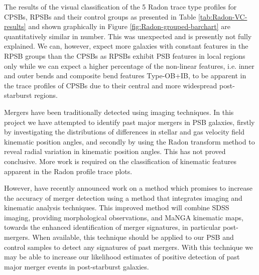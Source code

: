 The results of the visual classification of the 5 Radon trace type profiles for CPSBs, RPSBs and their control groups as presented in Table \ref{tab:Radon-VC-results} and shown graphically in Figure \ref{fig:Radon-grouped-barchart} are quantitatively similar in number. This was unexpected and is presently not fully explained. We can, however, expect more galaxies with constant features in the RPSB groups than the CPSBs as RPSBs exhibit PSB features in local regions only while we can expect a higher percentage of the non-linear features, i.e. inner and outer bends and composite bend features Type-OB+IB, to be apparent in the trace profiles of CPSBs due to their central and more widespread post-starburst regions. 

Mergers have been traditionally detected using imaging techniques. In this project we have attempted to identify past major mergers in PSB galaxies, firstly by investigating the distributions of differences in stellar and gas velocity field kinematic position angles, and secondly by using the Radon transform method to reveal radial variation in kinematic position angles. This has not proved conclusive. More work is required on the classification of kinematic features apparent in the Radon profile trace plots. 

However, \cite{2019DDA....5020304N} have recently announced work on a method which promises to increase the accuracy of merger detection using a method that integrates imaging and kinematic analysis techniques. This improved method will combine SDSS imaging, providing morphological observations, and MaNGA  kinematic maps, towards the enhanced identification of merger signatures, in particular post-mergers. When available, this technique should be applied to our PSB and control samples to detect any signatures of past mergers. With this technique we may be able to increase our likelihood estimates of positive detection of past major merger events in post-starburst galaxies.